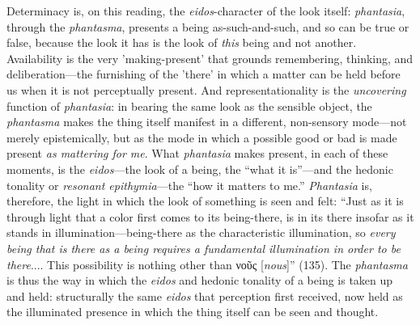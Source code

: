 \documentclass{article}
\newcommand{\gk}[1]{{\greekfont #1}}
\begin{document}
Determinacy is, on this reading, the \textit{eidos}-character of the look itself: \textit{phantasia}, through the \textit{phantasma}, presents a being as-such-and-such, and so can be true or false, because the look it has is the look of \textit{this} being and not another. Availability is the very 'making-present' that grounds remembering, thinking, and deliberation---the furnishing of the 'there' in which a matter can be held before us when it is not perceptually present. And representationality is the \textit{uncovering} function of \textit{phantasia}: in bearing the same look as the sensible object, the \textit{phantasma} makes the thing itself manifest in a different, non-sensory mode---not merely epistemically, but as the mode in which a possible good or bad is made present \textit{as mattering for me}. What \textit{phantasia} makes present, in each of these moments, is the \textit{eidos}---the look of a being, the ``what it is''---and the hedonic tonality or \textit{resonant epithymia}---the ``how it matters to me.'' \textit{Phantasia} is, therefore, the light in which the look of something is seen and felt: ``Just as it is through light that a color first comes to its being-there, is in its there insofar as it stands in illumination---being-there as the characteristic illumination, so \textit{every being that is there as a being requires a fundamental illumination in order to be there}.... This possibility is nothing other than \gk{νοῦς} [\textit{nous}]'' (135). The \textit{phantasma} is thus the way in which the \textit{eidos} and hedonic tonality of a being is taken up and held: structurally the same \textit{eidos} that perception first received, now held as the illuminated presence in which the thing itself can be seen and thought.
\end{document}
